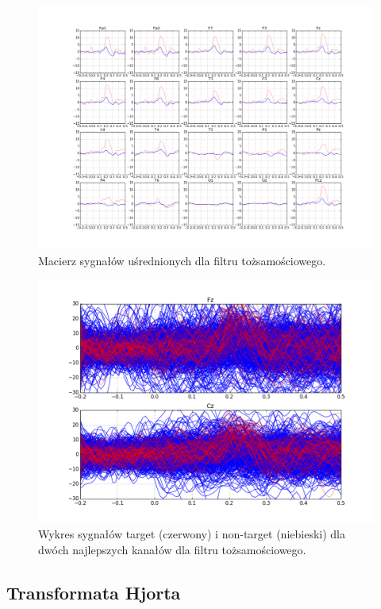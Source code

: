 \documentclass[licencjacka,openright]{pracamgr}
\begin{document}
\begin{figure}[H]
\centering
\includegraphics[scale=0.35, trim=10mm 25mm 10mm 25mm, clip=True]{pics/macierz_toz.png}
\caption{Macierz sygnałów uśrednionych dla filtru tożsamościowego.}
\label{maciez_toz}
\end{figure}

\begin{figure}[H]
\centering
\includegraphics[scale=0.55, trim=10mm 15mm 10mm 15mm, clip=True]{pics/sygnal_toz.png}
\caption{Wykres sygnałów target (czerwony) i non-target (niebieski) dla dwóch najlepszych kanałów dla filtru tożsamościowego.}
\label{sygnal_toz}
\end{figure}

\subsection{Transformata Hjorta}
\end{document}

